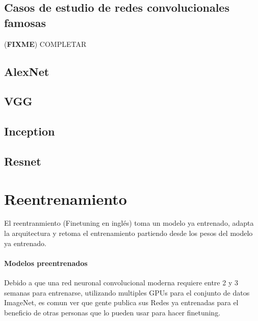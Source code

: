 \documentclass[a4paper,11pt,spanish]{book}
\newcommand*{\FIXME}[1]{{(\textbf{FIXME}) {#1}}}
\begin{document}
    \subsection {Casos de estudio de redes convolucionales famosas}
      \FIXME{COMPLETAR}
      \subsection{AlexNet}
      \subsection{VGG}
      \subsection{Inception}
      \subsection{Resnet}


    \section {Reentrenamiento}
      El reentranmiento (Finetuning en inglés) toma un modelo ya entrenado, adapta la arquitectura y retoma el entrenamiento partiendo desde los pesos del modelo ya entrenado.
      \paragraph{Modelos preentrenados}
	Debido a que una red neuronal convolucional moderna requiere entre 2 y 3 semanas para entrenarse, utilizando multiples GPUs para el conjunto de datos ImageNet, es comun ver que gente
	publica sus Redes ya entrenadas para el beneficio de otras personas que lo pueden usar para hacer finetuning.
\end{document}
